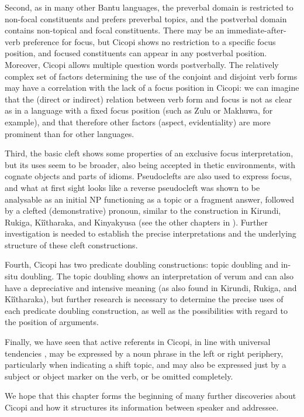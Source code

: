 \documentclass[output=paper]{langscibook}
\begin{document}
Second, as in many other Bantu languages, the preverbal domain is restricted to non-focal constituents and prefers preverbal topics, and the postverbal domain contains non-topical and focal constituents. There may be an immediate-after-verb preference for focus, but Cicopi shows no restriction to a specific focus position, and focused constituents can appear in any postverbal position. Moreover, Cicopi allows multiple question words postverbally. The relatively complex set of factors determining the use of the conjoint and disjoint verb forms may have a correlation with the lack of a focus position in Cicopi: we can imagine that the (direct or indirect) relation between verb form and focus is not as clear as in a language with a fixed focus position (such as Zulu or Makhuwa, for example), and that therefore other factors (aspect, evidentiality) are more prominent than for other languages.

Third, the basic cleft shows some properties of an exclusive focus interpretation, but its uses seem to be broader, also being accepted in thetic environments, with cognate objects and parts of idioms. Pseudoclefts are also used to express focus, and what at first sight looks like a reverse pseudocleft was shown to be analysable as an initial NP functioning as a topic or a fragment answer, followed by a clefted (demonstrative) pronoun, similar to the construction in Kirundi, Rukiga, Kîîtharaka, and Kinyakyusa (see the other chapters in \citealt{langsci-current-book}). Further investigation is needed to establish the precise interpretations and the underlying structure of these cleft constructions.

Fourth, Cicopi has two predicate doubling constructions: topic doubling and in-situ doubling. The topic doubling shows an interpretation of verum and can also have a depreciative and intensive meaning (as also found in Kirundi, Rukiga, and Kîîtharaka), but further research is necessary to determine the precise uses of each predicate doubling construction, as well as the possibilities with regard to the position of arguments.

Finally, we have seen that active referents in Cicopi, in line with universal tendencies \citep{Gundel1988, GundelEtAl1993}, may be expressed by a noun phrase in the left or right periphery, particularly when indicating a shift topic, and may also be expressed just by a subject or object marker on the verb, or be omitted completely.

We hope that this chapter forms the beginning of many further discoveries about Cicopi and how it structures its information between speaker and addressee.
\end{document}
